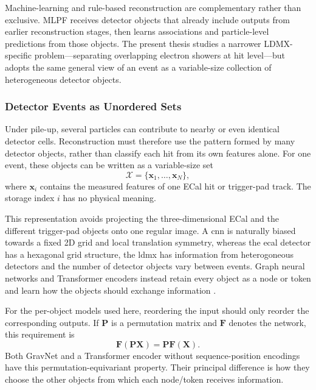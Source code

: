 Machine-learning and rule-based reconstruction are complementary rather than
exclusive. MLPF receives detector objects that already include outputs from
earlier reconstruction stages, then learns associations and particle-level
predictions from those objects. The present thesis studies a narrower
LDMX-specific problem---separating overlapping electron showers at hit
level---but adopts the same general view of an event as a variable-size
collection of heterogeneous detector objects.

\subsubsection{Detector Events as Unordered Sets}
\label{sec:detector_set_background}

Under pile-up, several particles can contribute to nearby or even identical
detector cells. Reconstruction must therefore use the pattern formed by many
detector objects, rather than classify each hit from its own features alone.
For one event, these objects can be written as a variable-size set
\begin{equation}
    \mathcal{X}
    =
    \{\mathbf{x}_1,\ldots,\mathbf{x}_N\},
\end{equation}
where \(\mathbf{x}_i\) contains the measured features of one ECal hit or
trigger-pad track. The storage index \(i\) has no physical meaning.

This representation avoids projecting the three-dimensional ECal and the
different trigger-pad objects onto one regular image. A \gls{cnn} is naturally biased towards a fixed 2D grid and local translation
symmetry, whereas the \gls{ecal} detector has a hexagonal grid structure, the \gls{ldmx} has information from heterogoneous detectors and the number of detector objects vary between
events. Graph neural networks and Transformer encoders instead retain every
object as a node or token and learn how the objects should exchange
information \cite{duarte2020-gnn-tracking,lee2019-set-transformer}.

For the per-object models used here, reordering the input should only reorder
the corresponding outputs. If \(\mathbf{P}\) is a permutation matrix and
\(\mathbf{F}\) denotes the network, this requirement is
\begin{equation}
    \mathbf{F}(\mathbf{P}\mathbf{X})
    =
    \mathbf{P}\mathbf{F}(\mathbf{X}).
\end{equation}
Both GravNet and a Transformer encoder without sequence-position encodings
have this permutation-equivariant property. Their principal difference is
how they choose the other objects from which each node/token receives
information.







